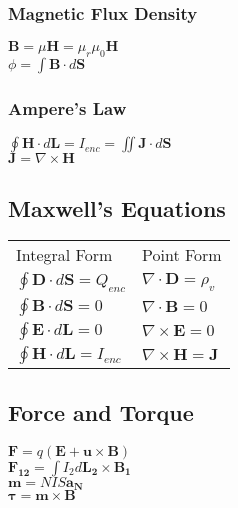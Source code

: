 \documentclass[12pt]{exam}
\begin{document}
\begin{multicols}{2}
\begin{flushleft}
	\subsubsection*{Magnetic Flux Density}
				\vspace{0.1in}
	{ \addtolength{\leftskip}{0.5in}
		$\mathbf{B} = \mu\mathbf{H} = \mu_r\mu_0\mathbf{H}$ \\[4pt]
		$\phi = \int\mathbf{B}\cdot d\mathbf{S} $ \\ [4 pt]
	}
			\vspace{0.1in}
	
	\subsubsection*{Ampere's Law}
				\vspace{0.1in}
	{ \addtolength{\leftskip}{0.5in}
		$\oint\mathbf{H}\cdot d\mathbf{L} = I_{enc} = \iint \mathbf{J} \cdot d\mathbf{S}$ \\[4pt]
		$\mathbf{J} = \nabla \times \mathbf{H}$ \\ [4 pt]
	}

	\subsection*{Maxwell's Equations}
	\vspace{0.1in}
	{\addtolength{\leftskip}{0.5in}
		\begin{tabular}{l l}
			Integral Form & Point Form \\ [4 pt]
			$\oint\mathbf{D}\cdot d\mathbf{S} = Q_{enc}$ & $\nabla\cdot\mathbf{D} = \rho_v$  \\[4 pt]
			$\oint\mathbf{B}\cdot d\mathbf{S} = 0$ &  $\nabla\cdot\mathbf{B} = 0$ \\[4 pt]
			$\oint\mathbf{E}\cdot d\mathbf{L} = 0$ &  $\nabla\times\mathbf{E} = 0$ \\[4 pt]
			$\oint\mathbf{H}\cdot d\mathbf{L} = I_{enc}$ &  $\nabla\times\mathbf{H} = \mathbf{J}$ \\[4 pt]
		\end{tabular}
	}

	\subsection*{Force and Torque}
	\vspace{0.1in}
	{\addtolength{\leftskip}{0.5in}
		$ \mathbf{F} = q(\mathbf{E}+\mathbf{u}\times\mathbf{B}) $ \\ [4 pt]
		$ \mathbf{F_{12}} = \int I_2d\mathbf{L_2}\times\mathbf{B_1} $ \\[4 pt]
		$ \mathbf{m} = NIS\mathbf{a_N} $ \\[4 pt]
		$ \mathbf{\tau} = \mathbf{m}\times\mathbf{B} $ \\[4 pt]
	}


\end{flushleft}
\end{multicols}
\end{document}

